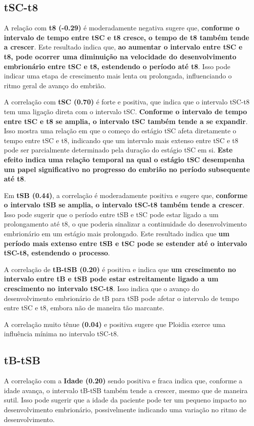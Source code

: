 \subsection*{tSC-t8}
A relação com \textbf{t8 (-0.29)} é moderadamente negativa sugere que, \textbf{conforme o intervalo de tempo entre tSC e t8 cresce, o tempo de t8 também tende a crescer}. Este resultado indica que,\textbf{ ao aumentar o intervalo entre tSC e t8, pode ocorrer uma diminuição na velocidade do desenvolvimento embrionário entre tSC e t8, estendendo o período até t8}. Isso pode indicar uma etapa de crescimento mais lenta ou prolongada, influenciando o ritmo geral de avanço do embrião.

A correlação com \textbf{tSC (0.70)} é forte e positiva, que indica que o intervalo tSC-t8 tem uma ligação direta com o intervalo tSC. \textbf{Conforme o intervalo de tempo entre tSC e t8 se amplia, o intervalo tSC também tende a se expandir}. Isso mostra uma relação em que o começo do estágio tSC afeta diretamente o tempo entre tSC e t8, indicando que um intervalo mais extenso entre tSC e t8 pode ser parcialmente determinado pela duração do estágio tSC em si. \textbf{Este efeito indica uma relação temporal na qual o estágio tSC desempenha um papel significativo no progresso do embrião no período subsequente até t8}.

Em \textbf{tSB (0.44)}, a correlação é moderadamente positiva e sugere que, \textbf{conforme o intervalo tSB se amplia, o intervalo tSC-t8 também tende a crescer}. Isso pode sugerir que o período entre tSB e tSC pode estar ligado a um prolongamento até t8, o que poderia sinalizar a continuidade do desenvolvimento embrionário em um estágio mais prolongado. Este resultado indica que\textbf{ um período mais extenso entre tSB e tSC pode se estender até o intervalo tSC-t8, estendendo o processo}.

A correlação de \textbf{tB-tSB (0.20)} é positiva e indica que \textbf{um crescimento no intervalo entre tB e tSB pode estar estreitamente ligado a um crescimento no intervalo tSC-t8}. Isso indica que o avanço do desenvolvimento embrionário de tB para tSB pode afetar o intervalo de tempo entre tSC e t8, embora não de maneira tão marcante.

A correlação muito tênue \textbf{(0.04)} e positiva sugere que Ploidia exerce uma influência mínima no intervalo tSC-t8. 

\subsection*{tB-tSB}
A correlação com a \textbf{Idade (0.20)} sendo positiva e fraca indica que, conforme a idade avança, o intervalo tB-tSB também tende a crescer, mesmo que de maneira sutil. Isso pode sugerir que a idade da paciente pode ter um pequeno impacto no desenvolvimento embrionário, possivelmente indicando uma variação no ritmo de desenvolvimento.

